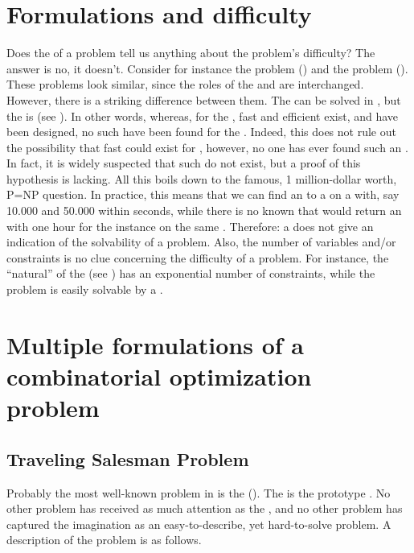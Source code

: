 \section{Formulations and difficulty}
Does the  of a problem tell us anything about the problem's difficulty? The answer is no, it doesn't. Consider for instance the  problem () and the  problem (). These problems look similar, since the roles of the  and  are interchanged. However, there is a striking difference between them. The  can be solved in , but the  is  (see ). In other words, whereas, for the , fast and efficient  exist, and have been designed, no such  have been found for the . Indeed, this does not rule out the possibility that fast  could exist for , however, no one has ever found such an . In fact, it is widely suspected that such  do not exist, but a proof of this hypothesis is lacking. All this boils down to the famous, 1 million-dollar worth, P=NP question. In practice, this means that we can find an  to a  on a  with, say 10.000  and 50.000  within seconds, while there is no  known that would return an  with one hour for the  instance on the same . Therefore: a  does not give an indication of the solvability of a problem. Also, the number of variables and/or constraints is no clue concerning the difficulty of a problem. For instance, the ``natural''  of the  (see ) has an exponential number of constraints, while the problem is easily solvable by a .

\section{Multiple formulations of a combinatorial optimization problem}

\subsection{Traveling Salesman Problem}
Probably the most well-known problem in  is the  (). The  is the prototype . No other problem has received as much attention as the , and no other problem has captured the imagination as an easy-to-describe, yet hard-to-solve problem. A description of the problem is as follows.

